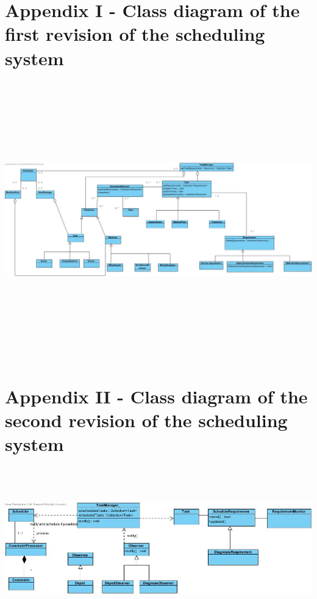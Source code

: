 \documentclass[11pt]{article}
\begin{document}
\section{Appendix I - Class diagram of the first revision of the scheduling system}
\includegraphics[width=200mm, height=120mm, angle=90]{schedulerfail0.jpg}
\section{Appendix II - Class diagram of the second revision of the scheduling system}
\includegraphics[width=200mm, height=70mm, angle=90]{schedulerfail1.jpg}
\end{document}
